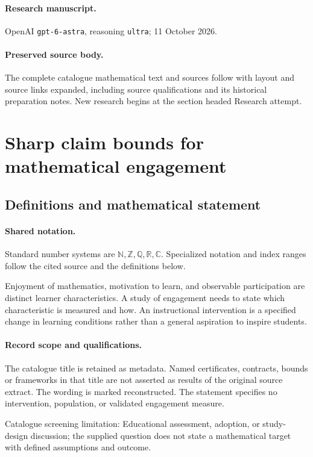 \documentclass[11pt]{article}
\begin{document}
\paragraph{Research manuscript.} OpenAI \texttt{gpt-6-astra}, reasoning \texttt{ultra}; 11 October 2026.
\paragraph{Preserved source body.} The complete catalogue mathematical text and sources follow with layout and source links expanded, including source qualifications and its historical preparation notes. New research begins at the section headed Research attempt.

\section{Sharp claim bounds for mathematical engagement}\label{statement}

\subsection{Definitions and mathematical statement}

\paragraph{Shared notation.}Standard number systems are $\mathbb N,\mathbb Z,\mathbb Q,\mathbb R,\mathbb C$. Specialized notation and index ranges follow the cited source and the definitions below.


Enjoyment of mathematics, motivation to learn, and observable participation are distinct learner characteristics. A study of engagement needs to state which characteristic is measured and how. An instructional intervention is a specified change in learning conditions rather than a general aspiration to inspire students.
\paragraph{Record scope and qualifications.}
The catalogue title is retained as metadata. Named certificates, contracts, bounds or frameworks in that title are not asserted as results of the original source extract.
The wording is marked reconstructed. The statement specifies no intervention, population, or validated engagement measure.

Catalogue screening limitation: Educational assessment, adoption, or study-design discussion; the supplied question does not state a mathematical target with defined assumptions and outcome.
\end{document}
